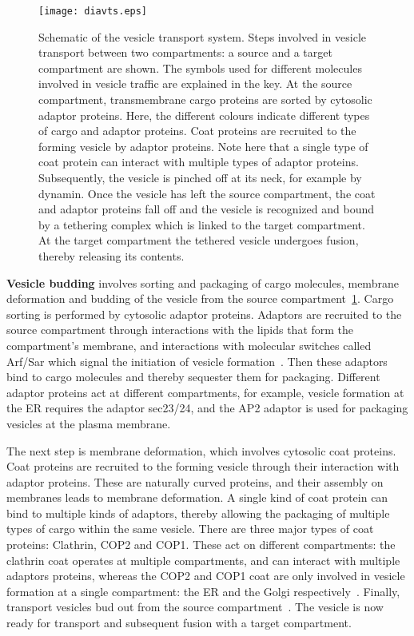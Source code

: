 \begin{figure}
	\texttt{[image: diavts.eps]}
	\caption{Schematic of the vesicle transport system. Steps involved in vesicle transport between two compartments: a source and a target compartment are shown. 
	The symbols used for different molecules involved in vesicle traffic are explained in the key. At the source compartment, transmembrane cargo proteins are sorted by cytosolic adaptor proteins. 
	Here, the different colours indicate different types of cargo and adaptor proteins. Coat proteins are recruited to the forming vesicle by adaptor proteins. 
	Note here that a single type of coat protein can interact with multiple types of adaptor proteins. Subsequently, the vesicle is pinched off at its neck, for example by dynamin. 
	Once the vesicle has left the source compartment, the coat and adaptor proteins fall off and the vesicle is recognized and bound by a tethering complex which is linked to the target compartment. 
	At the target compartment the tethered vesicle undergoes fusion, thereby releasing its contents.}
    \label{fig:vts}
\end{figure}

\textbf{Vesicle budding} involves sorting and packaging of cargo molecules, membrane deformation and budding of the vesicle from the source compartment~\ref{fig:vts}.
%
Cargo sorting is performed by cytosolic adaptor proteins. 
Adaptors are recruited to the source compartment through interactions with the lipids that form the compartment's membrane, and interactions with molecular switches called Arf/Sar which signal the initiation of vesicle formation~\cite{paczkowski2015cargo}. 
%
Then these adaptors bind to cargo molecules and thereby sequester them for packaging. 
%
Different adaptor proteins act at different compartments, for example, vesicle formation at the ER requires the adaptor sec23/24, and the AP2 adaptor is used for packaging vesicles at the plasma membrane.
%

The next step is membrane deformation, which involves cytosolic coat proteins. 
%
Coat proteins are recruited to the forming vesicle through their interaction with adaptor proteins. 
%
These are naturally curved proteins, and their assembly on membranes leads to membrane deformation.
%
A single kind of coat protein can bind to multiple kinds of adaptors, thereby allowing the packaging of multiple types of cargo within the same vesicle. 
%
There are three major types of coat proteins: Clathrin, COP2 and COP1. These act on different compartments: the clathrin coat operates at multiple compartments, and can interact with multiple adaptors proteins, whereas the COP2 and COP1 coat are only involved in vesicle formation at a single compartment: the ER and the Golgi respectively~\cite{faini2013vesicle}.
%
Finally, transport vesicles bud out from the source compartment~\cite{cocucci2014dynamin}.
%
The vesicle is now ready for transport and subsequent fusion with a target compartment.

